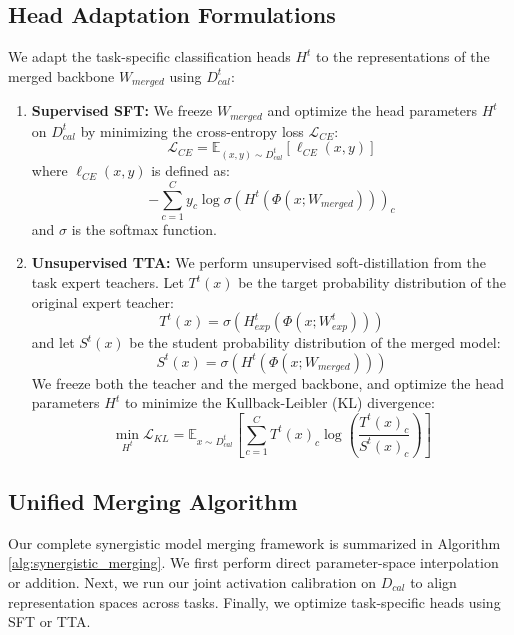 \documentclass{article}
\theoremstyle{plain}
\theoremstyle{definition}
\theoremstyle{remark}
\begin{document}
\subsection{Head Adaptation Formulations}
We adapt the task-specific classification heads $H^t$ to the representations of the merged backbone $W_{merged}$ using $D_{cal}^t$:
\begin{enumerate}
    \item \textbf{Supervised SFT:} We freeze $W_{merged}$ and optimize the head parameters $H^t$ on $D_{cal}^t$ by minimizing the cross-entropy loss $\mathcal{L}_{CE}$:
    \begin{equation}
        \mathcal{L}_{CE} = \mathbb{E}_{(x, y) \sim D_{cal}^t} \left[ \ell_{CE}(x, y) \right]
    \end{equation}
    where $\ell_{CE}(x, y)$ is defined as:
    \begin{equation}
        - \sum_{c=1}^C y_c \log \sigma \left( H^t(\Phi(x; W_{merged})) \right)_c
    \end{equation}
    and $\sigma$ is the softmax function.
    \item \textbf{Unsupervised TTA:} We perform unsupervised soft-distillation from the task expert teachers. Let $T^t(x)$ be the target probability distribution of the original expert teacher:
    \begin{equation}
        T^t(x) = \sigma(H_{exp}^t(\Phi(x; W_{exp}^t)))
    \end{equation}
    and let $S^t(x)$ be the student probability distribution of the merged model:
    \begin{equation}
        S^t(x) = \sigma(H^t(\Phi(x; W_{merged})))
    \end{equation}
    We freeze both the teacher and the merged backbone, and optimize the head parameters $H^t$ to minimize the Kullback-Leibler (KL) divergence:
    \begin{equation}
        \min_{H^t} \mathcal{L}_{KL} = \mathbb{E}_{x \sim D_{cal}^t} \left[ \sum_{c=1}^C T^t(x)_c \log \left( \frac{T^t(x)_c}{S^t(x)_c} \right) \right]
    \end{equation}
\end{enumerate}

\subsection{Unified Merging Algorithm}
Our complete synergistic model merging framework is summarized in Algorithm \ref{alg:synergistic_merging}. We first perform direct parameter-space interpolation or addition. Next, we run our joint activation calibration on $D_{cal}$ to align representation spaces across tasks. Finally, we optimize task-specific heads using SFT or TTA.
\end{document}
